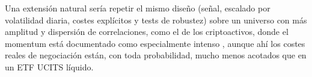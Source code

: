 \documentclass[12pt]{report} %
\begin{document}
Una extensión natural sería repetir el mismo diseño (señal, escalado por volatilidad diaria, costes explícitos y tests de robustez) sobre un universo con más amplitud y dispersión de correlaciones, como el de los criptoactivos, donde el momentum está documentado como especialmente intenso \citep{liutsyvinski2021}, aunque ahí los costes reales de negociación están, con toda probabilidad, mucho menos acotados que en un ETF UCITS líquido.






\clearpage
{}
\printbibliography




\end{document}
